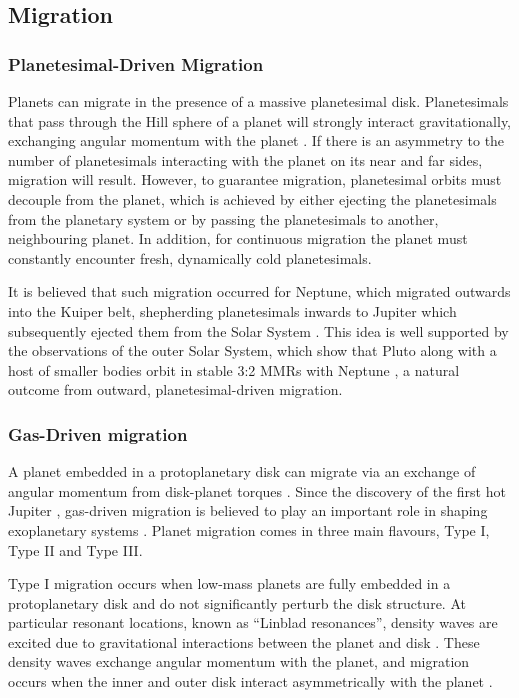 \documentclass[12pt,letter]{aastex}
\begin{document}
\subsection{Migration}
\subsubsection{Planetesimal-Driven Migration}
Planets can migrate in the presence of a massive planetesimal disk.
Planetesimals that pass through the Hill sphere of a planet will strongly interact gravitationally, exchanging angular momentum with the planet \citep{Ida2000, Kirsh2009}.
If there is an asymmetry to the number of planetesimals interacting with the planet on its near and far sides, migration will result. 
However, to guarantee migration, planetesimal orbits must decouple from the planet, which is achieved by either ejecting the planetesimals from the planetary system or by passing the planetesimals to another, neighbouring planet. 
In addition, for continuous migration the planet must constantly encounter fresh, dynamically cold planetesimals.  

It is believed that such migration occurred for Neptune, which migrated outwards into the Kuiper belt, shepherding planetesimals inwards to Jupiter which subsequently ejected them from the Solar System \citep{Fernandez1984}.
This idea is well supported by the observations of the outer Solar System, which show that Pluto along with a host of smaller bodies orbit in stable 3:2 MMRs with Neptune \citep{Malhotra1993, Malhotra1995}, a natural outcome from outward, planetesimal-driven migration. 

\subsubsection{Gas-Driven migration}
A planet embedded in a protoplanetary disk can migrate via an exchange of angular momentum from disk-planet torques \citep{Goldreich1980}.
Since the discovery of the first hot Jupiter \citep{Mayor1995}, gas-driven migration is believed to play an important role in shaping exoplanetary systems \citep{Lin1996}.
Planet migration comes in three main flavours, Type I, Type II and Type III. 

Type I migration occurs when low-mass planets are fully embedded in a protoplanetary disk and do not significantly perturb the disk structure. 
At particular resonant locations, known as ``Linblad resonances'', density waves are excited due to gravitational interactions between the planet and disk \citep{Goldreich1979}. 
These density waves exchange angular momentum with the planet, and migration occurs when the inner and outer disk interact asymmetrically with the planet \citep{Goldreich1979}.
\end{document}
